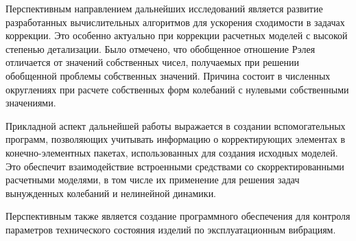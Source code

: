 Перспективным направлением дальнейших исследований является развитие разработанных вычислительных алгоритмов для ускорения сходимости в задачах коррекции. Это особенно актуально при коррекции расчетных моделей с высокой степенью детализации. Было отмечено, что обобщенное отношение Рэлея отличается от значений собственных чисел, получаемых при решении обобщенной проблемы собственных значений. Причина состоит в численных округлениях при расчете собственных форм колебаний с нулевыми собственными значениями.

Прикладной аспект дальнейшей работы выражается в создании вспомогательных программ, позволяющих учитывать информацию о корректирующих элементах в конечно-элементных пакетах, использованных для создания исходных моделей. Это обеспечит взаимодействие встроенными средствами со скорректированными расчетными моделями, в том числе их применение для решения задач вынужденных колебаний и нелинейной динамики.

Перспективным также является создание программного обеспечения для контроля параметров технического состояния изделий по эксплуатационным вибрациям.